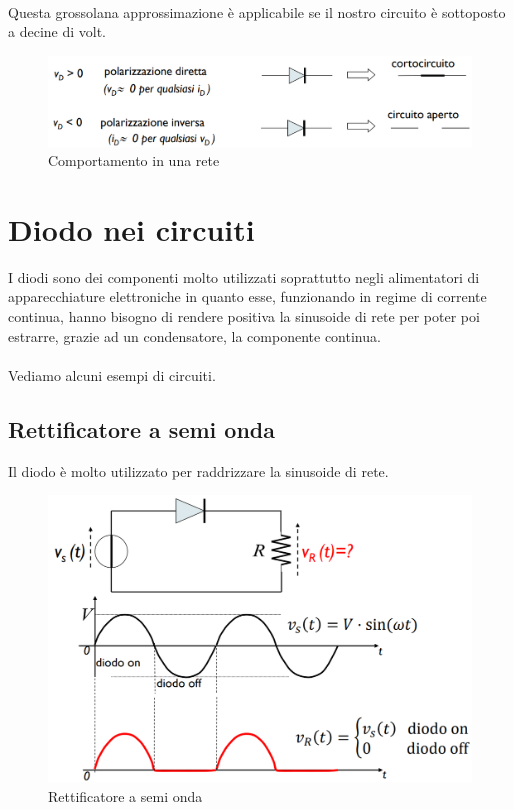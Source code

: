 \paragraph{}
Questa grossolana approssimazione è applicabile se il nostro circuito è sottoposto a decine di volt.
\begin{figure}[htbp]
    \centering
    \includegraphics[width=0.77\linewidth]{img/approx_diodo.png}
    \caption{Comportamento in una rete}    
\end{figure}


\section{Diodo nei circuiti}

I diodi sono dei componenti molto utilizzati soprattutto negli alimentatori di apparecchiature elettroniche in quanto esse, funzionando in regime di corrente continua, hanno bisogno di rendere positiva la sinusoide di rete per poter poi estrarre, grazie ad un condensatore, la componente continua.
\paragraph{}
Vediamo alcuni esempi di circuiti.
\newpage
\subsection{Rettificatore a semi onda}
Il diodo è molto utilizzato per raddrizzare la sinusoide di rete.

\begin{figure}[htbp]
    \centering
    \includegraphics[width=0.7\linewidth]{img/rettificatore.png}
    \caption{Rettificatore a semi onda}    
\end{figure}

